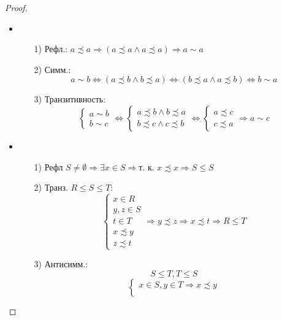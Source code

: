 \begin{proof}
  ~\newline
  \begin{itemize}
    \item 
      \begin{itemize}
        \item [1) ] Рефл.: $a \precsim a \Rightarrow (a \precsim a \land a \precsim a) \Rightarrow a \sim a$
        \item [2) ] Симм.:
          \[
            a \sim b \iff (a \precsim b \land b \precsim a) \iff (b \precsim a \land a \precsim b) \iff b \sim a
          \]
        \item [3) ] Транзитивность: \[
          \begin{cases}
          a \sim b \\
          b \sim c
          \end{cases} \iff
          \begin{cases}
             a \precsim b \land b \precsim a \\
             b \precsim c \land c \precsim b
          \end{cases} \iff
          \begin{cases}
          a \precsim c \\
          c \precsim a
          \end{cases} \Rightarrow a \sim c
        \]
      \end{itemize}
    \item
      \begin{itemize}
        \item [1) ] Рефл $ S \neq \emptyset \Rightarrow \exists x \in S \Rightarrow \text{т. к. } x \precsim x \Rightarrow S \leq S$
        \item [2) ] Транз. $R \leq S \leq T$:
          \[
          \begin{cases}
          x \in R \\
          y, z \in S \\
          t \in T \\
          x \precsim y \\
          z \precsim t
          \end{cases} \Rightarrow y \precsim z \Rightarrow x \precsim t \Rightarrow R \leq T 
          \]
        \item [3) ] Антисимм.:
          \[
          S \leq T, T \leq S
          \]
          \[
            \begin{cases}
          x \in S, y \in T \Rightarrow x \precsim y \\

\end{cases}\]
\end{itemize}
\end{itemize}
\end{proof}
